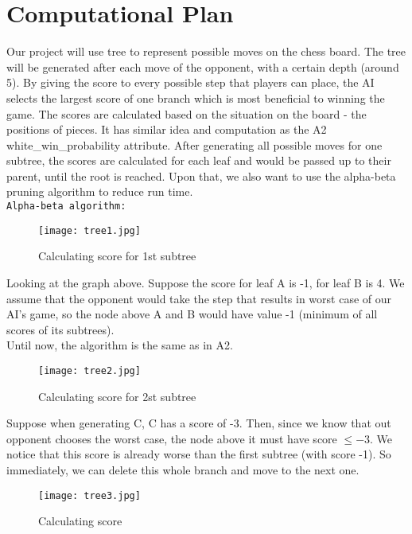 \documentclass[fontsize=11pt]{article}
\begin{document}
\section*{Computational Plan}
Our project will use tree to represent possible moves on the chess board. The tree will be generated after each move of the opponent, with a certain depth (around 5). 
By giving the score to every possible step that players can place, the AI selects the largest score of one branch which is most beneficial to winning the game. The scores are calculated based on the situation on the board - the positions of pieces. It has similar idea and computation as the A2 white\_win\_probability attribute. After generating all possible moves for one subtree, the scores are calculated for each leaf and would be passed up to their parent, until the root is reached. Upon that, we also want to use the alpha-beta pruning algorithm to reduce run time. \\

\textbullet \hspace{2mm} \texttt{Alpha-beta algorithm:}\\
\begin{figure}[h]
    \centering
    \texttt{[image: tree1.jpg]}
    \caption{Calculating score for 1st subtree}
    \label{fig:my_label}
\end{figure}

Looking at the graph above. Suppose the score for leaf A is -1, for leaf B is 4. We assume that the opponent would take the step that results in worst case of our AI's game, so the node above A and B would have value -1 (minimum of all scores of its subtrees). \\
Until now, the algorithm is the same as in A2. \\

\begin{figure}[h]
    \centering
    \texttt{[image: tree2.jpg]}
    \caption{Calculating score for 2st subtree}
    \label{fig:my_label}
\end{figure}

Suppose when generating C, C has a score of -3. Then, since we know that out opponent chooses the worst case, the node above it must have score $\leq -3$. We notice that this score is already worse than the first subtree (with score -1). So immediately, we can delete this whole branch and move to the next one. 

\begin{figure}[h]
    \centering
    \texttt{[image: tree3.jpg]}
    \caption{Calculating score}
    \label{fig:my_label}
\end{figure}
\end{document}
